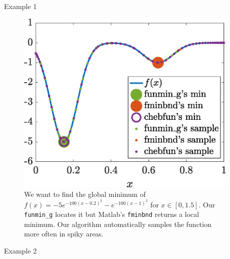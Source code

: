 \documentclass[final]{beamer}
\newlength{\sepwid}
\newlength{\onecolwid}
\newlength{\twocolwid}
\begin{document}
\begin{frame}[t]
\begin{columns}[t]
\begin{column}{\sepwid}\end{column} %

\begin{column}{\twocolwid} %

\begin{columns}[t,totalwidth=\twocolwid] %

\begin{column}{\onecolwid}\vspace{-.8in} %



\begin{block}{Example 1}
	\begin{figure}
		\centering
		\includegraphics[width=0.76\linewidth]{abstract/humps.eps}
		\caption{We want to find the global minimum of 
		$f(x) = -5 e^{-100(x-0.2)^2}-e^{ -100(x-1)^2}$ for $x \in [0, 1.5]$.
		Our \texttt{funmin\_g} locates it but Matlab's \texttt{fminbnd} returns a local minimum.
	         Our algorithm automatically samples the function more often in spiky areas.}
     \end{figure}
	
\end{block}	

%
%
%
\begin{block}{\vspace{-11mm}Example 2}


\end{block}
\end{column}
\end{columns}
\end{column}
\end{columns}
\end{frame}
\end{document}
